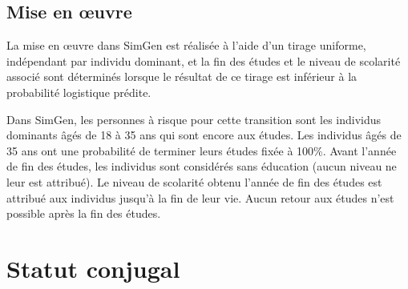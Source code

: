 \documentclass[letterpaper,10pt,french]{sphinxmanual}
\begin{document}
\subsection{Mise en œuvre}
\label{\detokenize{methodologie:id6}}
La mise en œuvre dans SimGen est réalisée à l’aide d’un tirage uniforme, indépendant par individu dominant, et la fin des études et le niveau de scolarité associé sont déterminés lorsque le résultat de ce tirage est inférieur à la probabilité logistique prédite.

Dans SimGen, les personnes à risque pour cette transition sont les individus dominants âgés de 18 à 35 ans qui sont encore aux études. Les individus âgés de 35 ans ont une probabilité de terminer leurs études fixée à 100\%. Avant l’année de fin des études, les individus sont considérés sans éducation (aucun niveau ne leur est attribué). Le niveau de scolarité obtenu l’année de fin des études est attribué aux individus jusqu’à la fin de leur vie. Aucun retour aux études n’est possible après la fin des études.


\section{Statut conjugal}
\label{\detokenize{methodologie:statut-conjugal}}
\end{document}
